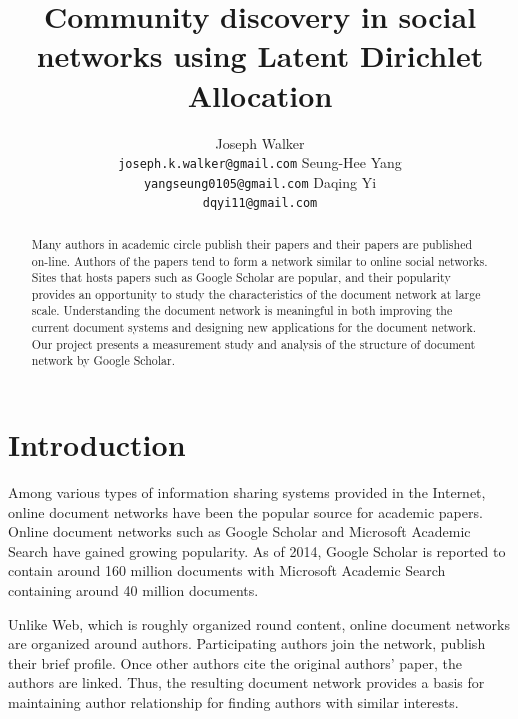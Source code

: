 \documentclass[letterpaper]{article}
\begin{document}
%
\title{Community discovery in social networks using Latent Dirichlet Allocation}

\author{ 
	Joseph Walker 
	\\ \texttt{joseph.k.walker@gmail.com}
	\And Seung-Hee Yang 
	\\ \texttt{yangseung0105@gmail.com}
	\And Daqing Yi 
	\\ \texttt{dqyi11@gmail.com}
}
\maketitle

\begin{abstract}
Many authors in academic circle publish their papers and their papers are published on-line. Authors of the papers tend to form a network similar to online social networks.
Sites that hosts papers such as Google Scholar are popular, and their popularity provides an opportunity to study the characteristics of the document network at large scale.
Understanding the document network is meaningful in both improving the current document systems and designing new applications for the document network.
Our project presents a measurement study and analysis of the structure of document network by Google Scholar. 
\end{abstract}

\section{Introduction}

Among various types of information sharing systems provided in the Internet, online document networks have been the popular source for academic papers.
Online document networks such as Google Scholar and Microsoft Academic Search have gained growing popularity.
As of 2014, Google Scholar is reported to contain around 160 million documents with Microsoft Academic Search containing around 40 million documents. 

Unlike Web, which is roughly organized round content, online document networks are organized around authors.
Participating authors join the network, publish their brief profile. Once other authors cite the original authors’ paper, the authors are linked. Thus, the resulting document network provides a basis for maintaining author relationship for finding authors with similar interests.
\end{document}
